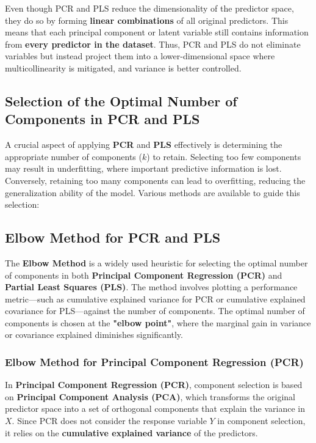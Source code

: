 \documentclass[11pt,twoside,a4paper]{article}
\begin{document}
Even though PCR and PLS reduce the dimensionality of the predictor space, they do so by forming \textbf{linear combinations} of all original predictors. This means that each principal component or latent variable still contains information from \textbf{every predictor in the dataset}. Thus, PCR and PLS do not eliminate variables but instead project them into a lower-dimensional space where multicollinearity is mitigated, and variance is better controlled.

\subsection{Selection of the Optimal Number of Components in PCR and PLS}
A crucial aspect of applying \textbf{PCR} and \textbf{PLS} effectively is determining the appropriate number of components (\( k \)) to retain. Selecting too few components may result in underfitting, where important predictive information is lost. Conversely, retaining too many components can lead to overfitting, reducing the generalization ability of the model. Various methods are available to guide this selection:
\subsection{Elbow Method for PCR and PLS}
The \textbf{Elbow Method} is a widely used heuristic for selecting the optimal number of components in both \textbf{Principal Component Regression (PCR)} and \textbf{Partial Least Squares (PLS)}. The method involves plotting a performance metric—such as cumulative explained variance for PCR or cumulative explained covariance for PLS—against the number of components. The optimal number of components is chosen at the \textbf{"elbow point"}, where the marginal gain in variance or covariance explained diminishes significantly.

\subsubsection{Elbow Method for Principal Component Regression (PCR)}
In \textbf{Principal Component Regression (PCR)}, component selection is based on \textbf{Principal Component Analysis (PCA)}, which transforms the original predictor space into a set of orthogonal components that explain the variance in \( X \). Since PCR does not consider the response variable \( Y \) in component selection, it relies on the \textbf{cumulative explained variance} of the predictors.
\end{document}
